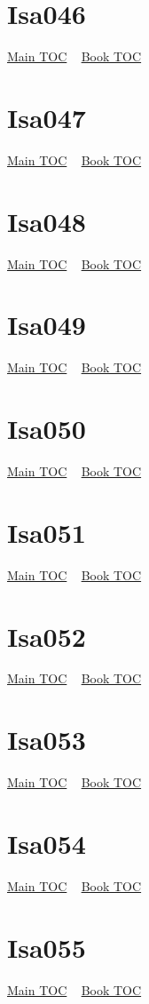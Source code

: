 \documentclass{book}
\begin{document}
  \section{Isa046}\hyperlink{toc}{Main TOC} ~ \hyperref[subsec:Isa]{Book TOC} 
  \section{Isa047}\hyperlink{toc}{Main TOC} ~ \hyperref[subsec:Isa]{Book TOC} 
  \section{Isa048}\hyperlink{toc}{Main TOC} ~ \hyperref[subsec:Isa]{Book TOC} 
  \section{Isa049}\hyperlink{toc}{Main TOC} ~ \hyperref[subsec:Isa]{Book TOC} 
  \section{Isa050}\hyperlink{toc}{Main TOC} ~ \hyperref[subsec:Isa]{Book TOC} 
  \section{Isa051}\hyperlink{toc}{Main TOC} ~ \hyperref[subsec:Isa]{Book TOC} 
  \section{Isa052}\hyperlink{toc}{Main TOC} ~ \hyperref[subsec:Isa]{Book TOC} 
  \section{Isa053}\hyperlink{toc}{Main TOC} ~ \hyperref[subsec:Isa]{Book TOC} 
  \section{Isa054}\hyperlink{toc}{Main TOC} ~ \hyperref[subsec:Isa]{Book TOC} 
  \section{Isa055}\hyperlink{toc}{Main TOC} ~ \hyperref[subsec:Isa]{Book TOC} 
\end{document}
